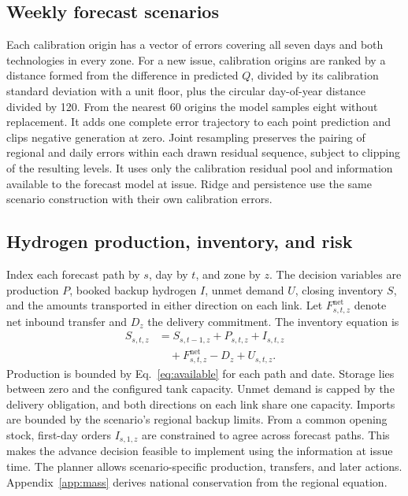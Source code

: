 \subsection{Weekly forecast scenarios}
Each calibration origin has a vector of errors covering all seven days and both technologies in every zone. For a new issue, calibration origins are ranked by a distance formed from the difference in predicted $Q$, divided by its calibration standard deviation with a unit floor, plus the circular day-of-year distance divided by 120. From the nearest 60 origins the model samples eight without replacement. It adds one complete error trajectory to each point prediction and clips negative generation at zero. Joint resampling preserves the pairing of regional and daily errors within each drawn residual sequence, subject to clipping of the resulting levels. It uses only the calibration residual pool and information available to the forecast model at issue. Ridge and persistence use the same scenario construction with their own calibration errors.

\subsection{Hydrogen production, inventory, and risk}
\label{sec:dispatch}
Index each forecast path by $s$, day by $t$, and zone by $z$. The decision variables are production $P$, booked backup hydrogen $I$, unmet demand $U$, closing inventory $S$, and the amounts transported in either direction on each link. Let $F^{\mathrm{net}}_{s,t,z}$ denote net inbound transfer and $D_z$ the delivery commitment. The inventory equation is
\begin{equation}
\label{eq:balance}
\begin{aligned}
S_{s,t,z} &= S_{s,t-1,z}+P_{s,t,z}+I_{s,t,z} \\
          &\quad+F^{\mathrm{net}}_{s,t,z}-D_z+U_{s,t,z}.
\end{aligned}
\end{equation}
Production is bounded by Eq.~\eqref{eq:available} for each path and date. Storage lies between zero and the configured tank capacity. Unmet demand is capped by the delivery obligation, and both directions on each link share one capacity. Imports are bounded by the scenario's regional backup limits. From a common opening stock, first-day orders $I_{s,1,z}$ are constrained to agree across forecast paths. This makes the advance decision feasible to implement using the information at issue time. The planner allows scenario-specific production, transfers, and later actions. Appendix~\ref{app:mass} derives national conservation from the regional equation.

